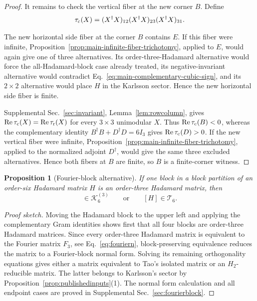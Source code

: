 \documentclass[aps,prx,reprint,nofootinbib,twoside,superscriptaddress,longbibliography,floatfix]{revtex4-2}
\newtheorem{proposition}[theorem]{Proposition}
\theoremstyle{definition}
\newcommand{\KK}{\mathcal K}
\newcommand{\RePart}{\operatorname{Re}}
\begin{document}
\begin{proof}
It remains to check the vertical fiber at the new corner $B$. Define
\begin{equation}
    \tau_{\rm c}(X)
=(X^\dagger X)_{12}(X^\dagger X)_{23}(X^\dagger X)_{31}.
\end{equation}

The new horizontal side fiber at the corner $B$ contains $E$. If this fiber were infinite, Proposition~\ref{prop:main-infinite-fiber-trichotomy}, applied to $E$, would again give one of three alternatives.
Its order-three-Hadamard alternative would force the all-Hadamard-block case already treated, its negative-invariant alternative would contradict Eq.~\eqref{eq:main-complementary-cubic-sign}, and its $2\times2$ alternative would place $H$ in the Karlsson sector. Hence the new horizontal side fiber is finite.

Supplemental Sec.~\ref{sec:invariant}, Lemma~\ref{lem:rowcolumn}, gives $\RePart\tau_{\rm c}(X)=\RePart\tau_{\rm r}(X)$  for every $3\times3$ unimodular $X$. Thus $\RePart\tau_{\rm c}(B)<0$, whereas the complementary identity $B^\dagger B+D^\dagger D=6I_3$ gives $\RePart\tau_{\rm c}(D)>0$. 
If the new vertical fiber were infinite, Proposition~\ref{prop:main-infinite-fiber-trichotomy}, applied to the normalized adjoint $D^\dagger$, would give the same three excluded alternatives. Hence both fibers at $B$ are finite, so $B$ is a finite-corner witness.
\end{proof}

\begin{proposition}[Fourier-block alternative]
\label{prop:main-fourier-block}
If one block in a block partition of an order-six Hadamard matrix $H$ is
an order-three Hadamard matrix, then
\begin{equation}
[H]\in\KK_6^{(3)}
\qquad\text{or}\qquad
[H]\in\mathcal T_6.
\label{eq:main-fourier-block-alternative}
\end{equation}
\end{proposition}

\begin{proof}[Proof sketch]
Moving the Hadamard block to the upper left and applying the complementary Gram identities shows first that all four blocks are order-three Hadamard matrices. Since every order-three Hadamard matrix is equivalent to the Fourier matrix $F_3$, see Eq.~\ref{eq:fouriern}, block-preserving equivalence reduces the matrix to a Fourier-block normal form. Solving its remaining orthogonality equations gives either a matrix equivalent to Tao's isolated matrix or an $H_2$-reducible matrix. The latter belongs to Karlsson's sector by Proposition~\ref{prop:publishedinputs}(1). The normal form calculation and all endpoint cases are proved in Supplemental Sec.~\ref{sec:fourierblock}.
\end{proof}
\end{document}
